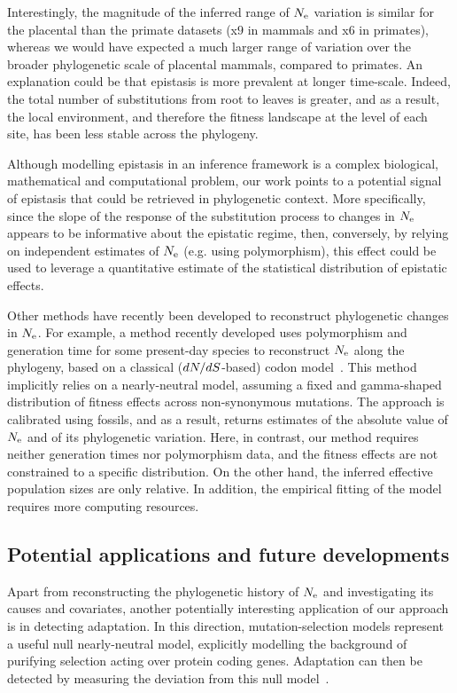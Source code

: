 Interestingly, the magnitude of the inferred range of $N_{\text{e}}$ variation is similar for the placental than the primate datasets (x$9$ in mammals and x$6$ in primates), whereas we would have expected a much larger range of variation over the broader phylogenetic scale of placental mammals, compared to primates.
An explanation could be that epistasis is more prevalent at longer time-scale.
Indeed, the total number of substitutions from root to leaves is greater, and as a result, the local environment, and therefore the fitness landscape at the level of each site, has been less stable across the phylogeny.

Although modelling epistasis in an inference framework is a complex biological, mathematical and computational problem, our work points to a potential signal of epistasis that could be retrieved in phylogenetic context.
More specifically, since the slope of the response of the substitution process to changes in $N_{\text{e}}$ appears to be informative about the epistatic regime, then, conversely, by relying on independent estimates of $N_{\text{e}}$ (e.g. using polymorphism), this effect could be used to leverage a quantitative estimate of the statistical distribution of epistatic effects.

Other methods have recently been developed to reconstruct phylogenetic changes in $N_{\text{e}}$.
For example, a method recently developed uses polymorphism and generation time for some present-day species to reconstruct $N_{\text{e}}$ along the phylogeny, based on a classical ($dN/dS$-based) codon model~\citep{Brevet2019}.
This method implicitly relies on a nearly-neutral model, assuming a fixed and gamma-shaped distribution of fitness effects across non-synonymous mutations.
The approach is calibrated using fossils, and as a result, returns estimates of the absolute value of $N_{\text{e}}$ and of its phylogenetic variation.
Here, in contrast, our method requires neither generation times nor polymorphism data, and the fitness effects are not constrained to a specific distribution.
On the other hand, the inferred effective population sizes are only relative.
In addition, the empirical fitting of the model requires more computing resources.

\subsection{Potential applications and future developments}

Apart from reconstructing the phylogenetic history of $N_{\text{e}}$ and investigating its causes and covariates, another potentially interesting application of our approach is in detecting adaptation.
In this direction, mutation-selection models represent a useful null nearly-neutral model, explicitly modelling the background of purifying selection acting over protein coding genes.
Adaptation can then be detected by measuring the deviation from this null model~\citep{Rodrigue2016, Bloom2017}.

